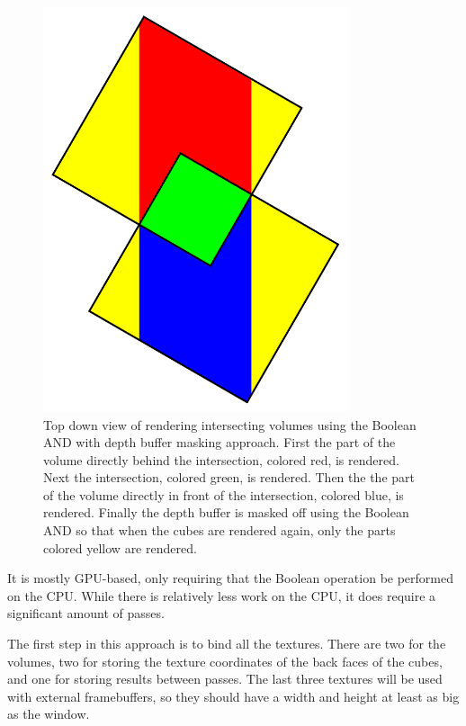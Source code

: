 \documentclass{article}
\begin{document}
\begin{figure}
\centering
\includegraphics[width=0.8\textwidth]{boolean-and.pdf}
\caption{
Top down view of rendering intersecting volumes using the Boolean AND with depth
buffer masking approach.  First the part of the volume directly behind the
intersection, colored red, is rendered.  Next the intersection, colored green,
is rendered.  Then the the part of the volume directly in front of the
intersection, colored blue, is rendered.  Finally the depth buffer is masked off
using the Boolean AND so that when the cubes are rendered again, only the parts
colored yellow are rendered.
}
\label{boolean-and}
\end{figure}

It is mostly GPU-based, only requiring that the Boolean operation be performed
on the CPU.  While there is relatively less work on the CPU, it does require a
significant amount of passes.

The first step in this approach is to bind all the textures.  There are two for
the volumes, two for storing the texture coordinates of the back faces of the
cubes, and one for storing results between passes.  The last three textures will
be used with external framebuffers, so they should have a width and height at
least as big as the window.
\end{document}
